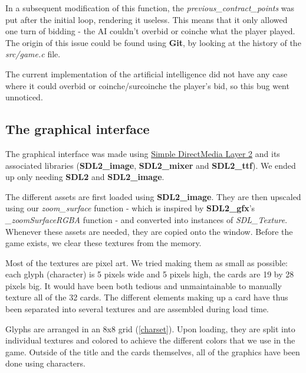 \documentclass[12pt]{article}
\begin{document}
\label{previous-contract-points}

In a subsequent modification of this function, the \textit{previous\_contract\_points} was put after the initial loop, rendering it useless.
This means that it only allowed one turn of bidding - the AI couldn't overbid or coinche what the player played.
The origin of this issue could be found using \textbf{Git}, by looking at the history of the \textit{src/game.c} file.

The current implementation of the artificial intelligence did not have any case where it could overbid or coinche/surcoinche the player's bid, so this bug went unnoticed.

\subsection{The graphical interface}

The graphical interface was made using \href{https://www.libsdl.org/index.php}{Simple DirectMedia Layer 2} and its associated libraries (\textbf{SDL2\_image}, \textbf{SDL2\_mixer} and \textbf{SDL2\_ttf}).
We ended up only needing \textbf{SDL2} and \textbf{SDL2\_image}.

The different assets are first loaded using \textbf{SDL2\_image}.
They are then upscaled using our \textit{zoom\_surface} function - which is inspired by \textbf{SDL2\_gfx}'s \textit{\_zoomSurfaceRGBA} function - and converted into instances of \textit{SDL\_Texture}.
Whenever these assets are needed, they are copied onto the window.
Before the game exists, we clear these textures from the memory.

Most of the textures are pixel art. We tried making them as small as possible:
each glyph (character) is 5 pixels wide and 5 pixels high, the cards are 19 by 28 pixels big.
It would have been both tedious and unmaintainable to manually texture all of the 32 cards.
The different elements making up a card have thus been separated into several textures and are assembled during load time.

Glyphs are arranged in an 8x8 grid (\ref{charset}).
Upon loading, they are split into individual textures and colored to achieve the different colors that we use in the game.
Outside of the title and the cards themselves, all of the graphics have been done using characters.
\end{document}
